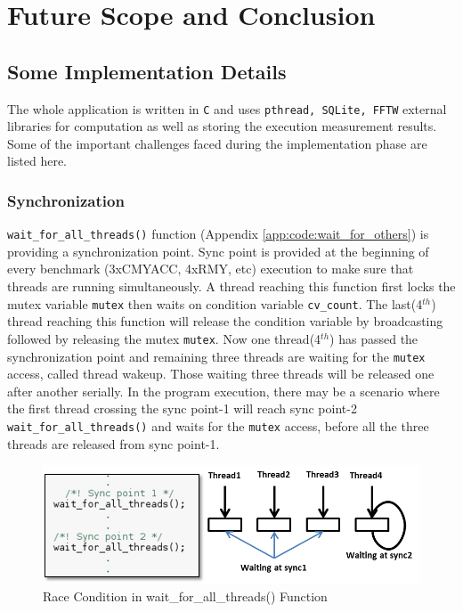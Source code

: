 \chapter{Future Scope and Conclusion}
\label{chap:conclusion}


\section{Some Implementation Details}
\label{sec:ch5:hurdles}
The whole application is written in \verb|C| and uses \verb|pthread, SQLite, FFTW| external libraries for computation as well as storing the execution measurement results. Some of the important challenges faced during the implementation phase are listed here.

\subsection{Synchronization}
\verb|wait_for_all_threads()| function (Appendix \ref{app:code:wait_for_others}) is providing a synchronization point. Sync point is provided at the beginning of every benchmark (3xCMYACC, 4xRMY, etc) execution to make sure that threads are running simultaneously. A thread reaching this function first locks the mutex variable \verb|mutex| then waits on condition variable \verb|cv_count|. The last(4$^{th}$) thread reaching this function will release the condition variable by broadcasting followed by releasing the mutex \verb|mutex|. Now one thread(4$^{th}$) has passed the synchronization point and remaining three threads are waiting for the \verb|mutex| access, called thread wakeup. Those waiting three threads will be released one after another serially. In the program execution, there may be a scenario where the first thread crossing the sync point-1 will reach sync point-2 \verb|wait_for_all_threads()| and waits for the \verb|mutex| access, before all the three threads are released from sync point-1.

\begin{figure}[h!]
	\centering
	\includegraphics[width=140mm]{figures/wait_for_all_threads}
	\caption{Race Condition in wait\_for\_all\_threads() Function}
	\label{fig:conclusion:thread_wakeup}
\end{figure}

